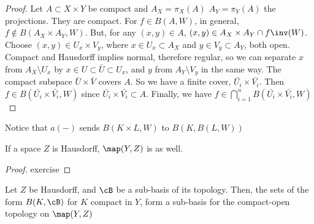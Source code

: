 \documentclass[main.tex]{subfiles}
\begin{document}
\begin{proof}
	Let \(A \subset X \times Y\) be compact and \(A_X = \pi_X(A)\) \(A_Y = \pi_Y(A)\) the projections.
	They are compact.
	For \(f \in B(A,W)\), in general, \(f \notin B(A_X \times A_Y, W)\).
	But, for any \((x,y) \in A\), \((x,y) \in A_X \times A_Y \cap f\inv(W)\).
	Choose \((x,y) \in U_x \times V_y\), where \(x \in U_x \subset A_X\) and \(y \in V_y \subset A_Y\), both open.
	Compact and Hausdorff implies normal, therefore regular, so we can separate \(x\) from \(A_X \setminus U_x\) by \(x \in U \subset \bar{U} \subset U_x\), and \(y\) from \(A_Y \setminus V_y\) in the same way.
	The compact subspace \(\bar U \times \bar V\) covers \(A\). So we have a finite cover, \(\bar{U_i} \times \bar{V_i}\).
	Then \(f \in B(\bar{U_i} \times \bar{V_i}, W)\) since \(\bar{U_i} \times \bar{V_i} \subset A\).
	Finally, we have \(f \in \bigcap_{i = 1}^n B(\bar{U_i} \times \bar{V_i}, W)\)
\end{proof}

\begin{rem}
	Notice that \(a(-)\) sends \(B(K \times L, W)\) to \(B(K, B(L,W))\)
\end{rem}

\begin{lemma}
	If a space \(Z\) is Hausdorff, \(\map(Y,Z)\) is as well.

\end{lemma}

\begin{proof}
	exercise

\end{proof}

\begin{lemma}
	Let \(Z\) be Hausdorff, and \(\cB\) be a sub-basis of its topology.
	Then, the sets of the form \(B(K, \cB)\) for \(K\) compact in \(Y\), form a sub-basis for the compact-open topology on \(\map(Y,Z)\)
\end{lemma}
\end{document}
